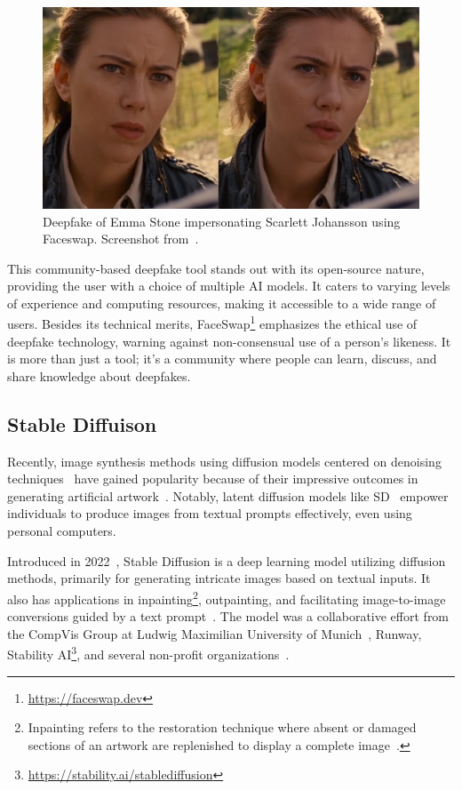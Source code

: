\begin{figure}[htpb]
	\centering
	\includegraphics[scale=0.32]{figures/emma-stone-faceswap}
	\caption{Deepfake of Emma Stone impersonating Scarlett Johansson using
		Faceswap. Screenshot from~\cite{emma-stone-faceswap}.}
\end{figure}

This community-based deepfake tool stands out with its open-source nature,
providing the user with a choice of multiple \ac{AI} models. It caters to
varying levels of experience and computing resources, making it accessible
to a wide range of users. Besides its technical merits,
FaceSwap\footnote{\url{https://faceswap.dev}} emphasizes the ethical use
of deepfake technology, warning against non-consensual use of a person's
likeness. It is more than just a tool; it's a community where people can
learn, discuss, and share knowledge about deepfakes.

\subsection{Stable Diffuison}\label{sec:stable-diffusion}
Recently, image synthesis methods using diffusion models centered on denoising
techniques~\cite{ho2020denoising} have gained popularity because of their impressive
outcomes in generating artificial artwork~\cite{10.1145/3588015.3589842}.
Notably, latent diffusion models like \ac{SD}~\cite{rombach2022highresolution}
empower individuals to produce images from textual prompts effectively,
even using personal computers.

Introduced in 2022~\cite{rombach2022highresolution}, Stable Diffusion is a deep learning
model utilizing diffusion methods, primarily for generating intricate images based
on textual inputs. It also has applications in inpainting\footnote{Inpainting refers
	to the restoration technique where absent or damaged sections of an artwork are
	replenished to display a complete image~\cite{enwiki:1164523541}.},
outpainting, and facilitating image-to-image conversions guided by a text
prompt~\cite{sd-hugging-face}. The model was a collaborative effort from the CompVis Group
at Ludwig Maximilian University of Munich~\cite{enwiki:1169859793}, Runway,
Stability AI\footnote{\url{https://stability.ai/stablediffusion}}, and
several non-profit organizations~\cite{sifted-2020,sd-lmu,stabilityai}.


